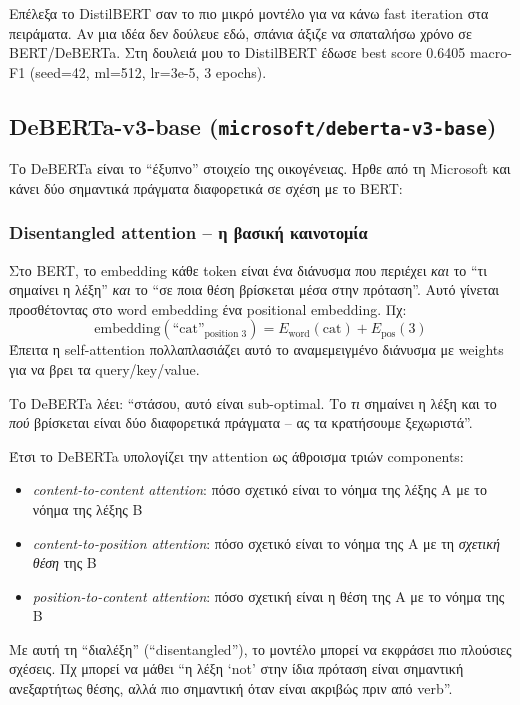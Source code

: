 \documentclass[12pt]{fphw}
\begin{document}
Επέλεξα το DistilBERT σαν το πιο μικρό μοντέλο για να κάνω fast iteration στα πειράματα. Αν μια ιδέα δεν δούλευε εδώ, σπάνια άξιζε να σπαταλήσω χρόνο σε BERT/DeBERTa. Στη δουλειά μου το DistilBERT έδωσε best score 0.6405 macro-F1 (seed=42, ml=512, lr=3e-5, 3 epochs).

\subsection{DeBERTa-v3-base (\texttt{microsoft/deberta-v3-base})}

Το DeBERTa \cite{he2021deberta} είναι το ``έξυπνο'' στοιχείο της οικογένειας. Ήρθε από τη Microsoft και κάνει δύο σημαντικά πράγματα διαφορετικά σε σχέση με το BERT:

\subsubsection{Disentangled attention -- η βασική καινοτομία}

Στο BERT, το embedding κάθε token είναι ένα διάνυσμα που περιέχει \emph{και} το ``τι σημαίνει η λέξη'' \emph{και} το ``σε ποια θέση βρίσκεται μέσα στην πρόταση''. Αυτό γίνεται προσθέτοντας στο word embedding ένα positional embedding. Πχ:
\[
\text{embedding}(\text{``cat''}_{\text{position 3}}) = E_{\text{word}}(\text{cat}) + E_{\text{pos}}(3)
\]
Έπειτα η self-attention πολλαπλασιάζει αυτό το αναμεμειγμένο διάνυσμα με weights για να βρει τα query/key/value.

Το DeBERTa λέει: ``στάσου, αυτό είναι sub-optimal. Το \emph{τι} σημαίνει η λέξη και το \emph{πού} βρίσκεται είναι δύο διαφορετικά πράγματα -- ας τα κρατήσουμε ξεχωριστά''.

Έτσι το DeBERTa υπολογίζει την attention ως άθροισμα τριών components:
\begin{itemize}
    \item \emph{content-to-content attention}: πόσο σχετικό είναι το νόημα της λέξης A με το νόημα της λέξης B
    \item \emph{content-to-position attention}: πόσο σχετικό είναι το νόημα της A με τη \emph{σχετική θέση} της B
    \item \emph{position-to-content attention}: πόσο σχετική είναι η θέση της A με το νόημα της B
\end{itemize}

Με αυτή τη ``διαλέξη'' (``disentangled''), το μοντέλο μπορεί να εκφράσει πιο πλούσιες σχέσεις. Πχ μπορεί να μάθει ``η λέξη ‘not' στην ίδια πρόταση είναι σημαντική ανεξαρτήτως θέσης, αλλά πιο σημαντική όταν είναι ακριβώς πριν από verb''.
\end{document}
